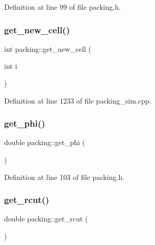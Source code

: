 Definition at line 99 of file packing.\+h.

\mbox{\label{classpacking_ac1311816bef393e5fccbbf61acefcb89}} 
\subsubsection{\texorpdfstring{get\+\_\+new\+\_\+cell()}{get\_new\_cell()}}
{\footnotesize\ttfamily int packing\+::get\+\_\+new\+\_\+cell (\begin{DoxyParamCaption}\item[{int}]{i }\end{DoxyParamCaption})}



Definition at line 1233 of file packing\+\_\+sim.\+cpp.

\mbox{\label{classpacking_a08f9bf70b057ad530e1499c15fdb34ff}} 
\subsubsection{\texorpdfstring{get\+\_\+phi()}{get\_phi()}}
{\footnotesize\ttfamily double packing\+::get\+\_\+phi (\begin{DoxyParamCaption}{ }\end{DoxyParamCaption})\hspace{0.3cm}{\ttfamily [inline]}}



Definition at line 103 of file packing.\+h.

\mbox{\label{classpacking_a9485b9495dbedd5d954bade26a3033b7}} 
\subsubsection{\texorpdfstring{get\+\_\+rcut()}{get\_rcut()}}
{\footnotesize\ttfamily double packing\+::get\+\_\+rcut (\begin{DoxyParamCaption}{ }\end{DoxyParamCaption})\hspace{0.3cm}{\ttfamily [inline]}}



